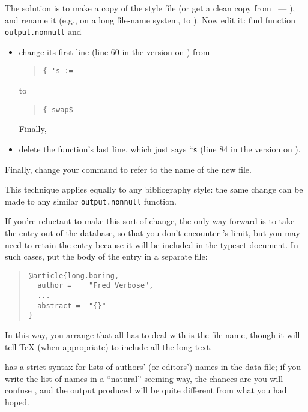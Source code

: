 The solution is to make a copy of the style file (or get a clean copy
from ~--- ), and rename it (e.g., on a
long file-name system, to ).  Now edit it: find
function \texttt{output.nonnull} and
\begin{itemize}
\item change its first line (line 60 in the version on )
  from
\begin{quote}
\begin{verbatim}
{ 's :=
\end{verbatim}
\end{quote}
to
\begin{quote}
\begin{verbatim}
{ swap$
\end{verbatim}
\end{quote}
Finally,
\item delete the function's last line, which just says ``\texttt{s}
  (line 84 in the version on ).
\end{itemize}
Finally, change your  command to refer to the
name of the new file.

This technique applies equally to any bibliography style: the same
change can be made to any similar \texttt{output.nonnull} function.

If you're reluctant to make this sort of change, the only way forward
is to take the entry out of the database, so that you don't encounter
\BibTeX{}'s limit, but you may need to retain the entry because it
will be included in the typeset document.  In such cases, put the body
of the entry in a separate file:
\begin{quote}
\begin{verbatim}
@article{long.boring,
  author =    "Fred Verbose",
  ...
  abstract =  "{}"
}
\end{verbatim}
\end{quote}
In this way, you arrange that all \BibTeX{} has to deal with is the
file name, though it will tell \TeX{} (when appropriate) to include
all the long text.


\BibTeX{} has a strict syntax for lists of authors' (or editors')
names in the \BibTeX{} data file; if you write the list of names in a
``natural''-seeming way, the chances are you will confuse \BibTeX{},
and the output produced will be quite different from what you had
hoped.


